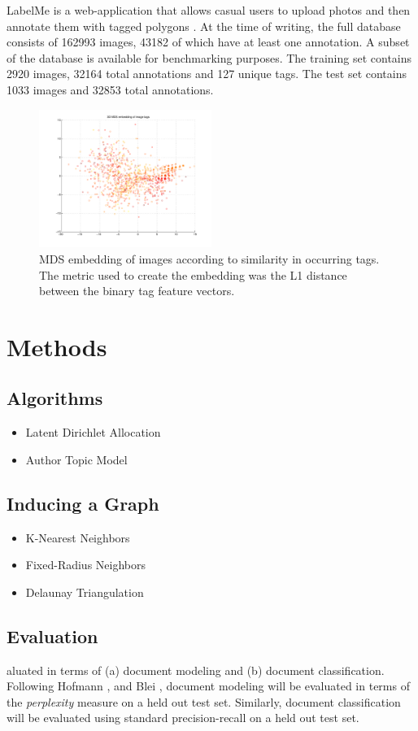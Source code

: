 \documentclass[twocolumn]{article}
\begin{document}
LabelMe is a web-application that allows casual users to upload photos and then annotate them with tagged polygons \cite{labelme}.  At the time of writing, the full database consists of 162993 images, 43182 of which have at least one annotation.  A subset of the database is available for benchmarking purposes.  The training set contains 2920 images, 32164 total annotations and 127 unique tags.  The test set contains 1033 images and 32853 total annotations.   
\begin{figure}[htb]
	\begin{center}
		\includegraphics[width=0.5\textwidth]{mds}
	\end{center}
	\caption{MDS embedding of images according to similarity in occurring tags.  The metric used to create the embedding was the L1 distance between the binary tag feature vectors.  }
	\label{fig:MDS}
\end{figure}

\section{Methods}
\subsection{Algorithms}
\begin{itemize}
	\item Latent Dirichlet Allocation
	\item Author Topic Model
\end{itemize}
\subsection{Inducing a Graph}
\begin{itemize}
	\item K-Nearest Neighbors
	\item Fixed-Radius Neighbors
	\item Delaunay Triangulation
\end{itemize}
\subsection{Evaluation}
aluated in terms of (a) document modeling and (b) document classification.  Following Hofmann \cite{hofmann99probabilistic}, and Blei \cite{blei02latent}, document modeling will be evaluated in terms of the \textit{perplexity} measure on a held out test set.  Similarly, document classification will be evaluated using standard precision-recall on a held out test set. 


\end{document}
